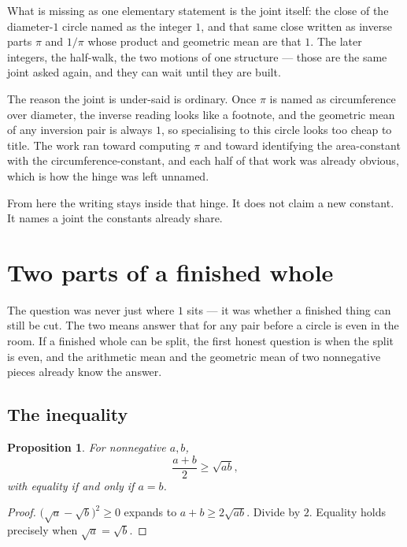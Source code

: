 \documentclass[10pt,a4paper]{article}
\theoremstyle{plain}
\newtheorem{proposition}{Proposition}
\theoremstyle{definition}
\theoremstyle{remark}
\begin{document}
What is missing as one elementary statement is the joint itself: the close of the diameter-\(1\) circle named as the integer \(1\), and that same close written as inverse parts \(\pi\) and \(1/\pi\) whose product and geometric mean are that \(1\).
The later integers, the half-walk, the two motions of one structure --- those are the same joint asked again, and they can wait until they are built.

The reason the joint is under-said is ordinary.
Once \(\pi\) is named as circumference over diameter, the inverse reading looks like a footnote, and the geometric mean of any inversion pair is always \(1\), so specialising to this circle looks too cheap to title.
The work ran toward computing \(\pi\) and toward identifying the area-constant with the circumference-constant, and each half of that work was already obvious, which is how the hinge was left unnamed.

From here the writing stays inside that hinge.
It does not claim a new constant.
It names a joint the constants already share.

\section{Two parts of a finished whole}

The question was never just where \(1\) sits --- it was whether a finished thing can still be cut.
The two means answer that for any pair before a circle is even in the room.
If a finished whole can be split, the first honest question is when the split is even, and the arithmetic mean and the geometric mean of two nonnegative pieces already know the answer.

\subsection{The inequality}

\begin{proposition}
\label{prop:amgm}
For nonnegative \(a,b\),
\[
\frac{a+b}{2}\ge\sqrt{ab},
\]
with equality if and only if \(a=b\).
\end{proposition}

\begin{proof}
\(\bigl(\sqrt{a}-\sqrt{b}\bigr)^{2}\ge0\) expands to \(a+b\ge 2\sqrt{ab}\).
Divide by \(2\).
Equality holds precisely when \(\sqrt{a}=\sqrt{b}\).
\end{proof}
\end{document}
